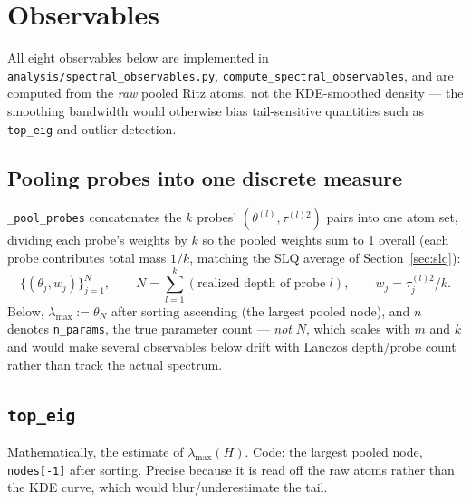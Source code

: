 \documentclass[11pt]{article}
\newcommand{\code}[1]{\texttt{#1}}
\begin{document}
\section{Observables}
\label{sec:observables}

All eight observables below are implemented in
\code{analysis/spectral_observables.py}, \code{compute_spectral_observables},
and are computed from the \emph{raw} pooled Ritz atoms, not the
KDE-smoothed density --- the smoothing bandwidth would otherwise bias
tail-sensitive quantities such as \code{top_eig} and outlier detection.

\subsection{Pooling probes into one discrete measure}
\label{sec:pooling}

\code{_pool_probes} concatenates the \(k\) probes' \((\theta^{(l)},
\tau^{(l)2})\) pairs into one atom set, dividing each probe's weights by
\(k\) so the pooled weights sum to 1 overall (each probe contributes total
mass \(1/k\), matching the SLQ average of Section~\ref{sec:slq}):
\[
\{(\theta_j, w_j)\}_{j=1}^{N}, \qquad N = \sum_{l=1}^k (\text{realized depth of probe } l),
\qquad w_j = \tau_j^{(l)2}/k.
\]
Below, \(\lambda_{\max} := \theta_N\) after sorting ascending (the largest
pooled node), and \(n\) denotes \code{n_params}, the true parameter count
--- \emph{not} \(N\), which scales with \(m\) and \(k\) and would make
several observables below drift with Lanczos depth/probe count rather than
track the actual spectrum.

\subsection{\code{top_eig}}
Mathematically, the estimate of \(\lambda_{\max}(H)\). Code: the largest
pooled node, \code{nodes[-1]} after sorting. Precise because it is read off
the raw atoms rather than the KDE curve, which would blur/underestimate the
tail.
\end{document}
